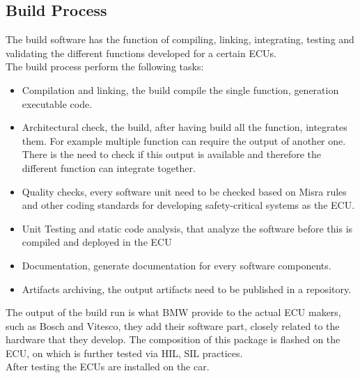 \documentclass[../main.tex]{subfiles}
\begin{document}
\subsection{Build Process}
\label{subsection:Build process}
The build software has the function of compiling, linking, integrating, testing and validating the different functions developed for a certain ECUs. \\
The build process perform the following tasks:
\begin{itemize}
    \item Compilation and linking, the build compile the single function, generation executable code. 
    \item Architectural check, the build, after having build all the function, integrates them. For example multiple function can require the output of another one. There is the need to check if this output is available and therefore the different function can integrate together.
    \item Quality checks, every software unit need to be checked based on Misra rules and other coding standards for developing safety-critical systems as the ECU.
    \item Unit Testing and static code analysis, that analyze the software before this is compiled and deployed in the ECU
    \item Documentation, generate documentation for every software components. 
    \item Artifacts archiving, the output artifacts need to be published in a repository. 
\end{itemize}
The output of the build run is what BMW provide to the actual ECU makers, such as Bosch and Vitesco, they add their software part, closely related to the hardware that they develop. The composition of this package is flashed on the ECU, on which is further tested via HIL, SIL practices.\\
After testing the ECUs are installed on the car.
\end{document}
